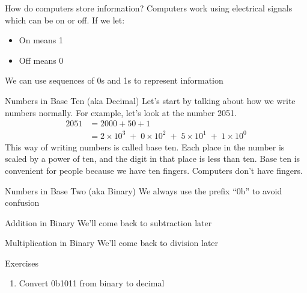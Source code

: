 

\begin{frame}{How do computers store information?}
Computers work using electrical signals which can be on or off. If we let:
\begin{itemize}
    \item On means 1
    \item Off means 0
\end{itemize}
We can use sequences of 0s and 1s to represent information
\end{frame}


\begin{frame}{Numbers in Base Ten (aka Decimal)}
Let's start by talking about how we write numbers normally. For example, let's look at the number 2051. 
\begin{align*}
2051 &= 2000 + 50 + 1 \\
&= 2 \times 10^3 \;+\; 0 \times 10^2 \;+\; 5 \times 10^1 \;+\; 1 \times 10^0
\end{align*}
This way of writing numbers is called base ten. Each place in the number is scaled by a power of ten, and the digit in that place is less than ten. 
Base ten is convenient for people because we have ten fingers. 
Computers don't have fingers.
\end{frame}
    
\begin{frame}{Numbers in Base Two (aka Binary)}
We always use the prefix ``0b'' to avoid confusion
\end{frame}

\begin{frame}{Addition in Binary}
We'll come back to subtraction later
\end{frame}
    
\begin{frame}{Multiplication in Binary}
We'll come back to division later
\end{frame}


\begin{frame}{Exercises}
\begin{enumerate}
    \item Convert 0b1011 from binary to decimal
\end{enumerate}
\end{frame}
    



